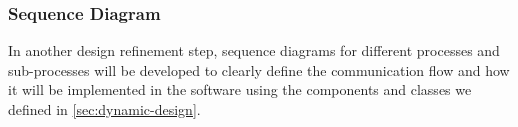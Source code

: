 \subsubsection{Sequence Diagram}

In another design refinement step, sequence diagrams for different processes and sub-processes will be developed to clearly define the communication flow and how it will be implemented in the software using the components and classes we defined in \ref{sec:dynamic-design}.
